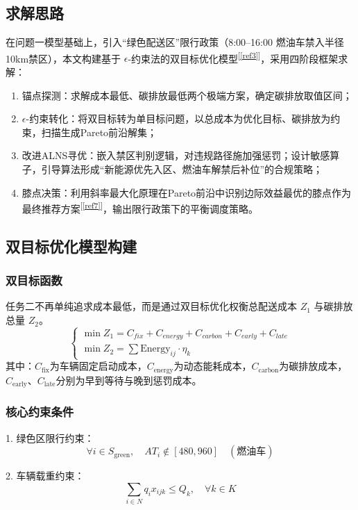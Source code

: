 \documentclass[12pt,a4paper]{article}
\begin{document}
\subsection{求解思路}
在问题一模型基础上，引入“绿色配送区”限行政策（8:00–16:00 燃油车禁入半径10km禁区），本文构建基于 $\epsilon$-约束法的双目标优化模型\textsuperscript{[\ref{ref3}]}，采用四阶段框架求解：
\begin{enumerate}
    \item 锚点探测：求解成本最低、碳排放最低两个极端方案，确定碳排放取值区间；
    \item $\epsilon$-约束转化：将双目标转为单目标问题，以总成本为优化目标、碳排放为约束，扫描生成Pareto前沿解集；
    \item 改进ALNS寻优：嵌入禁区判别逻辑，对违规路径施加强惩罚；设计敏感算子，引导算法形成“新能源优先入区、燃油车解禁后补位”的合规策略；
    \item 膝点决策：利用斜率最大化原理在Pareto前沿中识别边际效益最优的膝点作为最终推荐方案\textsuperscript{[\ref{ref7}]}，输出限行政策下的平衡调度策略。
\end{enumerate}
\subsection{双目标优化模型构建}

\subsubsection{双目标函数}
任务二不再单纯追求成本最低，而是通过双目标优化权衡总配送成本 $Z_1$ 与碳排放总量 $Z_2$。
\[
\begin{cases}
\min Z_1 = C_{fix} + C_{energy} + C_{carbon} + C_{early} + C_{late} \\
\min Z_2 = \sum \text{Energy}_{ij} \cdot \eta_k
\end{cases}
\]
其中：$C_{\text{fix}}$为车辆固定启动成本，$C_{\text{energy}}$为动态能耗成本，$C_{\text{carbon}}$为碳排放成本，$C_{\text{early}}$、$C_{\text{late}}$分别为早到等待与晚到惩罚成本。

\subsubsection{核心约束条件}

1. 绿色区限行约束：
\[
\forall i \in S_{\text{green}}, \quad AT_i \notin [480,960] \quad (\text{燃油车})
\]

2. 车辆载重约束：
\[
\sum_{i \in N} q_i x_{ijk} \leq Q_k, \quad \forall k \in K
\]
\end{document}
